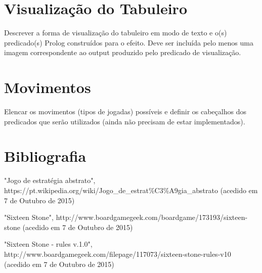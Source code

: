\documentclass[a4paper]{article}
\begin{document}
\newpage

\section{Visualização do Tabuleiro}

Descrever a forma de visualização do tabuleiro em modo de texto e o(s) predicado(s) Prolog construídos para o efeito.
Deve ser incluída pelo menos uma imagem correspondente ao output produzido pelo predicado de visualização.


\section{Movimentos}

Elencar os movimentos (tipos de jogadas) possíveis e definir os cabeçalhos dos predicados que serão utilizados (ainda não precisam de estar implementados).

\newpage

\section*{Bibliografia}

"Jogo de estratégia abstrato", https://pt.wikipedia.org/wiki/Jogo\_de\_estrat\%C3\%A9gia\_abstrato (acedido em 7 de Outubro de 2015) \newline

"Sixteen Stone", http://www.boardgamegeek.com/boardgame/173193/sixteen-stone (acedido em 7 de Outubro de 2015) \newline

"Sixteen Stone - rules v.1.0", http://www.boardgamegeek.com/filepage/117073/sixteen-stone-rules-v10 (acedido em 7 de Outubro de 2015) \newline
\end{document}
